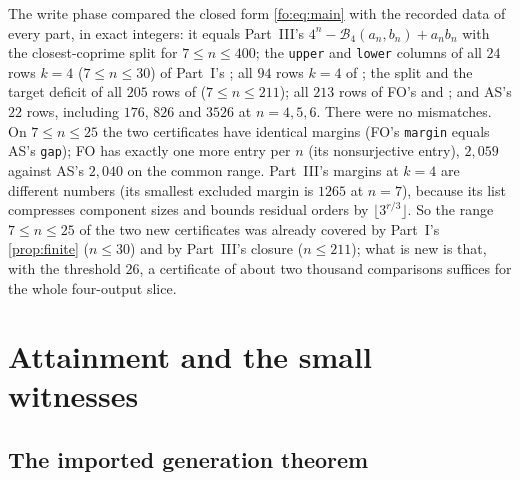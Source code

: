 \documentclass[11pt,a4paper]{article}
\numberwithin{equation}{section}
\theoremstyle{definition}
\theoremstyle{remark}
\newcommand{\Bip}{\mathcal B}
\begin{document}
The write phase compared the closed form \eqref{fo:eq:main} with the recorded
data of every part, in exact integers: it equals Part~III's
$4^n-\Bip_4(a_n,b_n)+a_nb_n$ with the closest-coprime split for $7\le n\le400$;
the \texttt{upper} and \texttt{lower} columns of all $24$ rows $k=4$
($7\le n\le30$) of Part~I's ; all $94$
rows $k=4$ of ; the split and
the target deficit of all $205$ rows of
 ($7\le n\le211$); all $213$
rows of FO's  and
; and AS's $22$ rows, including $176$, $826$ and
$3526$ at $n=4,5,6$. There were no mismatches. On $7\le n\le25$ the two
certificates have identical margins (FO's \texttt{margin} equals AS's
\texttt{gap}); FO has exactly one more entry per $n$ (its nonsurjective
entry), $2{,}059$ against AS's $2{,}040$ on the common range. Part~III's
margins at $k=4$ are different numbers (its smallest excluded margin is
$1265$ at $n=7$), because its list compresses component sizes and bounds
residual orders by $\lfloor3^{r/3}\rfloor$. So the range $7\le n\le25$ of
the two new certificates was already covered by Part~I's
\cref{prop:finite} ($n\le30$) and by Part~III's closure ($n\le211$); what is
new is that, with the threshold $26$, a certificate of about two thousand
comparisons suffices for the whole four-output slice.

\section{Attainment and the small witnesses}\label{fo:sec:attainment}

\subsection{The imported generation theorem}
\end{document}
